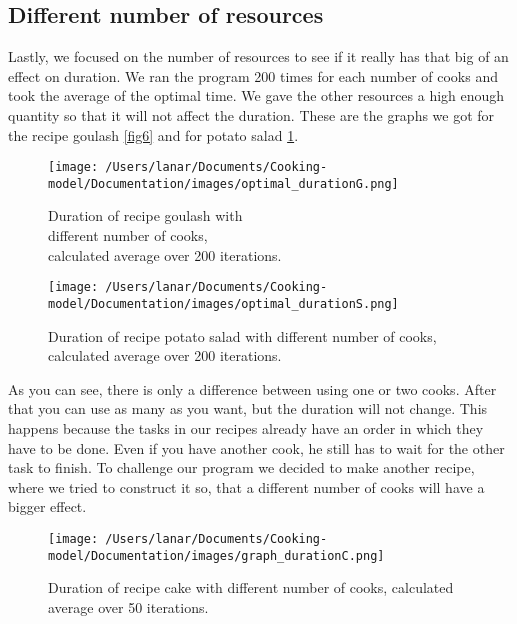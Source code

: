 \subsection{Different number of resources}
Lastly, we focused on the number of resources to see if it really has that big of an effect on duration. 
We ran the program 200 times for each number of cooks and took the average of the optimal time. We gave the other resources a high enough quantity so that it will not affect the duration.
These are the graphs we got for the recipe goulash \ref{fig6} and for potato salad \ref{fig7}.

\begin{figure}[H]
    \centering
    \begin{minipage}{.5\textwidth}
      \centering
      \texttt{[image: /Users/lanar/Documents/Cooking-model/Documentation/images/optimal\_durationG.png]}
      \caption{Duration of recipe goulash with \\ different number of cooks,\\ calculated average over 200 iterations.}
      \label{fig6}
    \end{minipage}%
    \begin{minipage}{.5\textwidth}
      \centering
      \texttt{[image: /Users/lanar/Documents/Cooking-model/Documentation/images/optimal\_durationS.png]}
      \caption{Duration of recipe potato salad with different number of cooks, calculated average over 200 iterations.}
      \label{fig7}
    \end{minipage}
\end{figure}

As you can see, there is only a difference between using one or two cooks. After that you can use as many as you want, but the duration will not change. 
This happens because the tasks in our recipes already have an order in which they have to be done. Even if you have another cook, he still has to wait for the other task to finish. 
To challenge our program we decided to make another recipe, where we tried to construct it so, that a different number of cooks will have a bigger effect.

\begin{figure}[H]
    \centerline{\texttt{[image: /Users/lanar/Documents/Cooking-model/Documentation/images/graph\_durationC.png]}}
    \caption{Duration of recipe cake with different number of cooks, calculated average over 50 iterations.}
    \label{fig8}
\end{figure}

